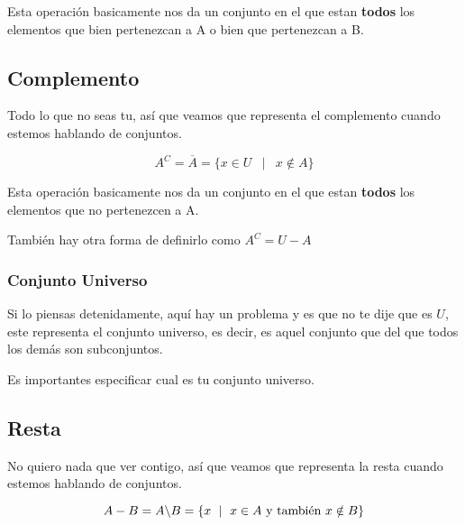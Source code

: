 \documentclass[12pt]{report}                                    %
\DeclareMathOperator \Space {\quad}                             %
\DeclareMathOperator \MiniSpace {\;}                            %
\newcommand \Such {\MiniSpace|\MiniSpace}                       %
\begin{document}
                Esta operación basicamente nos da un conjunto en el que estan \textbf{todos} los elementos
                que bien pertenezcan a A o bien que pertenezcan a B.


            \clearpage
            \subsection{Complemento}

                Todo lo que no seas tu, así que veamos que representa el complemento cuando estemos
                hablando de conjuntos.

                \begin{equation}
                    A^C = \overline A = \{ x \in U \Such x \notin A \}
                \end{equation}

                Esta operación basicamente nos da un conjunto en el que estan \textbf{todos} los elementos
                que no pertenezcen a A.

                También hay otra forma de definirlo como $A^C = U - A$

                \subsubsection{Conjunto Universo}
                    Si lo piensas detenidamente, aquí hay un problema y es que no te dije que es $U$, este
                    representa el conjunto universo, es decir, es aquel conjunto que del que todos los demás
                    son subconjuntos.

                    Es importantes especificar cual es tu conjunto universo.


            \clearpage
            \subsection{Resta}

                No quiero nada que ver contigo, así que veamos que representa la resta cuando estemos
                hablando de conjuntos.

                \begin{equation}
                    A - B = A \char`\\ B = \{ x \Such x \in A \text{ y también }  x \notin B \}
                \end{equation}
\end{document}
